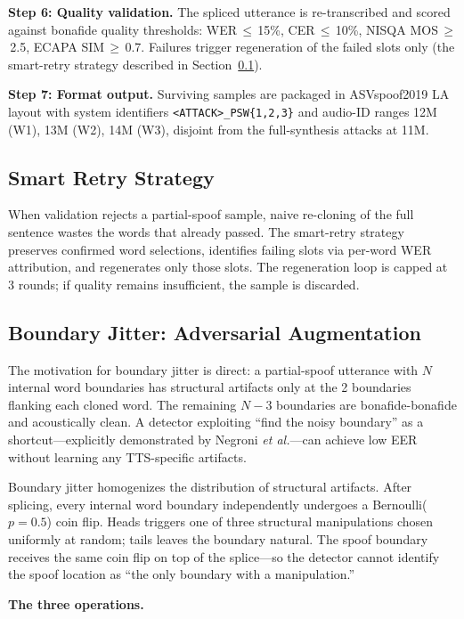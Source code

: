 \documentclass[conference]{IEEEtran}
\begin{document}
\textbf{Step 6: Quality validation.} The spliced utterance is re-transcribed and scored against bonafide quality thresholds: WER\,$\leq$\,15\%, CER\,$\leq$\,10\%, NISQA MOS\,$\geq$\,2.5, ECAPA SIM\,$\geq$\,0.7. Failures trigger regeneration of the failed slots only (the smart-retry strategy described in Section~\ref{sec:retry}).

\textbf{Step 7: Format output.} Surviving samples are packaged in ASVspoof2019 LA layout with system identifiers \texttt{<ATTACK>\_PSW\{1,2,3\}} and audio-ID ranges 12M (W1), 13M (W2), 14M (W3), disjoint from the full-synthesis attacks at 11M.

\subsection{Smart Retry Strategy}\label{sec:retry}

When validation rejects a partial-spoof sample, naive re-cloning of the full sentence wastes the words that already passed. The smart-retry strategy preserves confirmed word selections, identifies failing slots via per-word WER attribution, and regenerates only those slots. The regeneration loop is capped at 3 rounds; if quality remains insufficient, the sample is discarded.

\subsection{Boundary Jitter: Adversarial Augmentation}

The motivation for boundary jitter is direct: a partial-spoof utterance with $N$ internal word boundaries has structural artifacts only at the 2 boundaries flanking each cloned word. The remaining $N-3$ boundaries are bonafide-bonafide and acoustically clean. A detector exploiting ``find the noisy boundary'' as a shortcut---explicitly demonstrated by Negroni \emph{et al.}---can achieve low EER without learning any TTS-specific artifacts.

Boundary jitter homogenizes the distribution of structural artifacts. After splicing, every internal word boundary independently undergoes a Bernoulli($p{=}0.5$) coin flip. Heads triggers one of three structural manipulations chosen uniformly at random; tails leaves the boundary natural. The spoof boundary receives the same coin flip on top of the splice---so the detector cannot identify the spoof location as ``the only boundary with a manipulation.''

\textbf{The three operations.}
\end{document}
